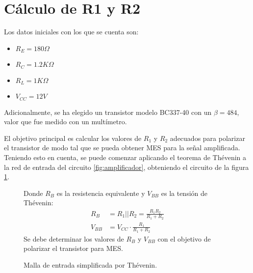 \section{Cálculo de R1 y R2} \label{section:calc_r1_r2}
Los datos iniciales con los que se cuenta son:
\begin{itemize}
    \item $R_E = 180\Omega$
    \item $R_C = 1.2K\Omega$
    \item $R_L = 1K\Omega$
    \item $V_{CC} = 12V$
\end{itemize}
Adicionalmente, se ha elegido un transistor modelo BC337-40 con un $\beta = 484$, valor que fue medido con un
multímetro.

El objetivo principal es calcular los valores de $R_1$ y $R_2$ adecuados para polarizar el transistor de modo tal que
se pueda obtener MES para la señal amplificada. Teniendo esto en cuenta, se puede comenzar aplicando el teorema de
Thévenin a la red de entrada del circuito \ref{fig:amplificador}, obteniendo el circuito de la figura
\ref{fig:malla-entrada}.

\begin{figure}[H]
    \centering
    \begin{minipage}{0.4\textwidth}
        \centering
        \caption{Malla de entrada simplificada por Thévenin.}
        \label{fig:malla-entrada}
    \end{minipage}%
    \begin{minipage}{0.4\textwidth}
        \centering
        Donde $R_{B}$ es la resistencia equivalente y $V_{BB}$ es la tensión de Thévenin:
        \begin{align}
            R_{B} &= R_1||R_2=\frac{R_1 R_2}{R_1 + R_2} \label{ec:thevenin-rb}\\
            V_{BB} &= V_{CC} \cdot \frac{R_1}{R_1 + R_2} \label{ec:thevenin-vbb}
        \end{align}
        Se debe determinar los valores de $R_B$ y $V_{BB}$ con el objetivo de polarizar
        el transistor para MES.
    \end{minipage}
\end{figure}

